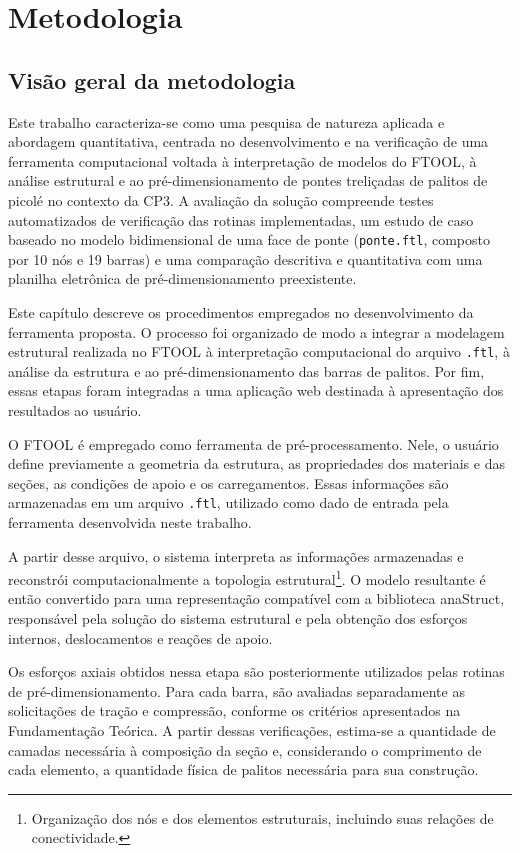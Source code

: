 \chapter{Metodologia}
\label{cap:metodologia}

\section{Visão geral da metodologia}

Este trabalho caracteriza-se como uma pesquisa de natureza aplicada e abordagem quantitativa, centrada no desenvolvimento e na verificação de uma ferramenta computacional voltada à interpretação de modelos do \acrshort{FTOOL}, à análise estrutural e ao pré-dimensionamento de pontes treliçadas de palitos de picolé no contexto da \acrshort{CP3}. A avaliação da solução compreende testes automatizados de verificação das rotinas implementadas, um estudo de caso baseado no modelo bidimensional de uma face de ponte (\texttt{ponte.ftl}, composto por 10 nós e 19 barras) e uma comparação descritiva e quantitativa com uma planilha eletrônica de pré-dimensionamento preexistente.

Este capítulo descreve os procedimentos empregados no desenvolvimento da ferramenta proposta. O processo foi organizado de modo a integrar a modelagem estrutural realizada no \acrshort{FTOOL} à interpretação computacional do arquivo \texttt{.ftl}, à análise da estrutura e ao pré-dimensionamento das barras de palitos. Por fim, essas etapas foram integradas a uma aplicação web destinada à apresentação dos resultados ao usuário.

O \acrshort{FTOOL} é empregado como ferramenta de pré-processamento. Nele, o usuário define previamente a geometria da estrutura, as propriedades dos materiais e das seções, as condições de apoio e os carregamentos. Essas informações são armazenadas em um arquivo \texttt{.ftl}, utilizado como dado de entrada pela ferramenta desenvolvida neste trabalho.

A partir desse arquivo, o sistema interpreta as informações armazenadas e reconstrói computacionalmente a topologia estrutural\footnote{Organização dos nós e dos elementos estruturais, incluindo suas relações de conectividade.}. O modelo resultante é então convertido para uma representação compatível com a biblioteca anaStruct, responsável pela solução do sistema estrutural e pela obtenção dos esforços internos, deslocamentos e reações de apoio.

Os esforços axiais obtidos nessa etapa são posteriormente utilizados pelas rotinas de pré-dimensionamento. Para cada barra, são avaliadas separadamente as solicitações de tração e compressão, conforme os critérios apresentados na Fundamentação Teórica. A partir dessas verificações, estima-se a quantidade de camadas necessária à composição da seção e, considerando o comprimento de cada elemento, a quantidade física de palitos necessária para sua construção.

